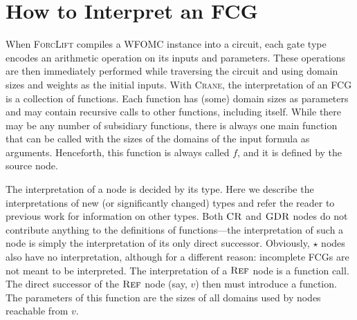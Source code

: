 \documentclass[letterpaper]{article} %
\DeclareMathOperator{\CR}{\textsc{CR}}
\DeclareMathOperator{\GDR}{\textsc{GDR}}
\DeclareMathOperator{\Reff}{\textsc{Ref}}
\theoremstyle{definition}
\begin{document}
\section{How to Interpret an FCG}\label{sec:interpret}

When \textsc{ForcLift} \citep{DBLP:conf/ijcai/BroeckTMDR11} compiles a WFOMC
instance into a circuit, each gate type encodes an arithmetic operation on its
inputs and parameters. These operations are then immediately performed while
traversing the circuit and using domain sizes and weights as the initial inputs.
With \textsc{Crane}, the interpretation of an FCG is a collection of functions.
Each function has (some) domain sizes as parameters and may contain recursive
calls to other functions, including itself. While there may be any number of
subsidiary functions, there is always one main function that can be called with
the sizes of the domains of the input formula as arguments. Henceforth, this
function is always called $f$, and it is defined by the source node.

The interpretation of a node is decided by its type. Here we describe the
interpretations of new (or significantly changed) types and refer the reader to
previous work \citep{DBLP:conf/ijcai/BroeckTMDR11} for information on other
types. Both $\CR$ and $\GDR$ nodes do not contribute anything to the definitions
of functions---the interpretation of such a node is simply the interpretation of
its only direct successor. Obviously, $\star$ nodes also have no interpretation,
although for a different reason: incomplete FCGs are not meant to be
interpreted. The interpretation of a $\Reff$ node is a function call. The direct
successor of the $\Reff$ node (say, $v$) then must introduce a function. The
parameters of this function are the sizes of all domains used by nodes reachable
from $v$.
\end{document}

